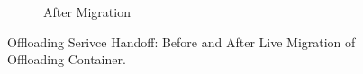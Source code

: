\begin{figure}
\begin{subfigure}[b]{0.23\textwidth}
\caption{After Migration}
\label{subfig:after}
\end{subfigure}
\caption{ Offloading Serivce Handoff: Before and After Live Migration of Offloading Container. }
\label{fig:before-after}
\end{figure}